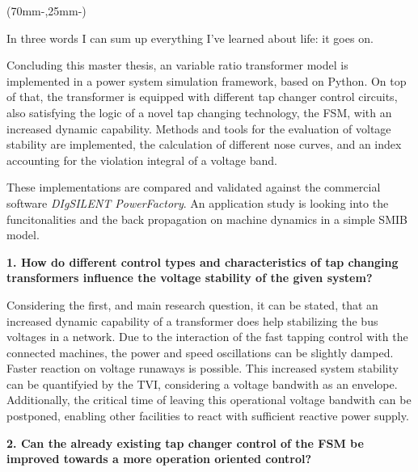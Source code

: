\begin{textblock*}{.7\textwidth}(70mm-\offset,25mm-\offset)
    \begin{fquote}
        In three words I can sum up everything I've learned about life: it goes on.
    \end{fquote}
\end{textblock*}

Concluding this master thesis, an variable ratio transformer model is implemented in a power system simulation framework, based on Python.
On top of that, the transformer is equipped with different tap changer control circuits, also satisfying the logic of a novel tap changing technology, the \acf{FSM}, with an increased dynamic capability.
Methods and tools for the evaluation of voltage stability are implemented, the calculation of different nose curves, and an index accounting for the violation integral of a voltage band.

These implementations are compared and validated against the commercial software \textit{DIgSILENT PowerFactory}.
An application study is looking into the funcitonalities and the back propagation on machine dynamics in a simple \acf{SMIB} model.

\textbf{1. How do different control types and characteristics of tap changing transformers influence the voltage stability of the given system?}

Considering the first, and main research question, it can be stated, that an increased dynamic capability of a transformer does help stabilizing the bus voltages in a network.
Due to the interaction of the fast tapping control with the connected machines, the power and speed oscillations can be slightly damped.
Faster reaction on voltage runaways is possible.
This increased system stability can be quantifyied by the \acf{TVI}, considering a voltage bandwith as an envelope.
Additionally, the critical time of leaving this operational voltage bandwith can be postponed, enabling other facilities to react with sufficient reactive power supply.

\textbf{2. Can the already existing tap changer control of the \acf{FSM} be improved towards a more operation oriented control?}

